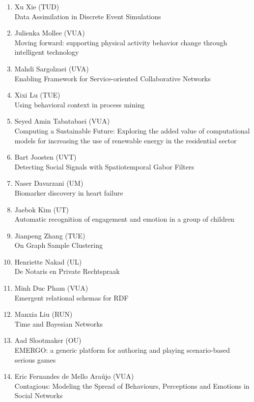 \begin{multicols}{2}
\begin{scriptsize}
\begin{enumerate}[label=\textbf{2017-\arabic*},leftmargin=0cm,itemindent=1.15cm,labelwidth=\itemindent,labelsep=0cm,align=left,noitemsep]
\item Xu Xie (TUD)     \\
	Data Assimilation in Discrete Event Simulations 

\item Julienka Mollee (VUA)    \\
	Moving forward: supporting physical activity behavior change through intelligent technology 
\item Mahdi Sargolzaei (UVA)     \\
	Enabling Framework for Service-oriented Collaborative Networks 
	
\item Xixi Lu (TUE)    \\
	Using behavioral context in process mining
\item Seyed Amin Tabatabaei (VUA)     \\
	Computing a Sustainable Future: Exploring the added value of computational models for increasing the use of renewable energy in the residential sector 
	
\item Bart Joosten (UVT)    \\
	Detecting Social Signals with Spatiotemporal Gabor Filters
\item Naser Davarzani (UM)     \\
	Biomarker discovery in heart failure
\item Jaebok Kim (UT)    \\
	Automatic recognition of engagement and emotion in a group of children 
	
	
\item Jianpeng Zhang (TUE)    \\
	On Graph Sample Clustering 
\item Henriette Nakad (UL)   \\
	De Notaris en Private Rechtspraak 
\item Minh Duc Pham (VUA)   \\
	Emergent relational schemas for RDF 
\item Manxia Liu (RUN)   \\
	Time and Bayesian Networks 
\item Aad Slootmaker (OU)   \\
	EMERGO: a generic platform for authoring and playing scenario-based serious games 
\item Eric Fernandes de Mello Araújo (VUA)  \\
	Contagious: Modeling the Spread of Behaviours, Perceptions and Emotions in Social Networks 

\end{enumerate}


\end{scriptsize}
\end{multicols}
